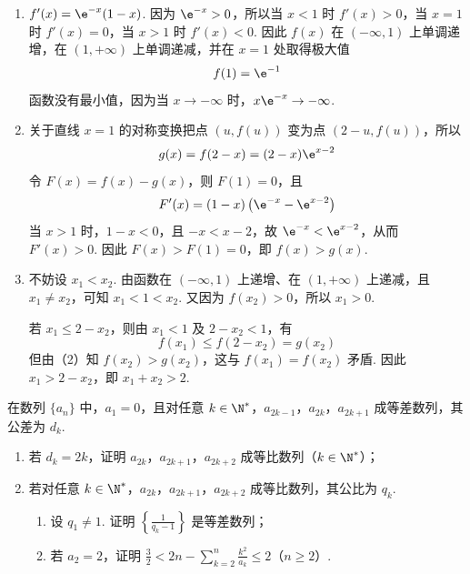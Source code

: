 \begin{solution}
\begin{enumerate}
\item \(f'(x)=\e^{-x}(1-x)\). 因为 \(\e^{-x}>0\)，所以当 \(x<1\) 时 \(f'(x)>0\)，当 \(x=1\) 时 \(f'(x)=0\)，当 \(x>1\) 时 \(f'(x)<0\). 因此 \(f(x)\) 在 \((-\infty,1)\) 上单调递增，在 \((1,+\infty)\) 上单调递减，并在 \(x=1\) 处取得极大值
\[
f(1)=\e^{-1}
\]
函数没有最小值，因为当 \(x\to-\infty\) 时，\(x\e^{-x}\to-\infty\).
\item 关于直线 \(x=1\) 的对称变换把点 \((u,f(u))\) 变为点 \((2-u,f(u))\)，所以
\[
g(x)=f(2-x)=(2-x)\e^{x-2}
\]
令 \(F(x)=f(x)-g(x)\)，则 \(F(1)=0\)，且
\[
F'(x)=(1-x)\left(\e^{-x}-\e^{x-2}\right)
\]
当 \(x>1\) 时，\(1-x<0\)，且 \(-x<x-2\)，故 \(\e^{-x}<\e^{x-2}\)，从而 \(F'(x)>0\). 因此 \(F(x)>F(1)=0\)，即 \(f(x)>g(x)\).
\item 不妨设 \(x_1<x_2\). 由函数在 \((-\infty,1)\) 上递增、在 \((1,+\infty)\) 上递减，且 \(x_1\ne x_2\)，可知 \(x_1<1<x_2\). 又因为 \(f(x_2)>0\)，所以 \(x_1>0\).

若 \(x_1\leqslant2-x_2\)，则由 \(x_1<1\) 及 \(2-x_2<1\)，有
\[
f(x_1)\leqslant f(2-x_2)=g(x_2)
\]
但由（2）知 \(f(x_2)>g(x_2)\)，这与 \(f(x_1)=f(x_2)\) 矛盾. 因此 \(x_1>2-x_2\)，即 \(x_1+x_2>2\).
\end{enumerate}
\end{solution}

\begin{problem}
在数列 \(\{a_{n}\}\) 中，\(a_{1} = 0\)，且对任意 \(k \in \N^*\)，\(a_{2k-1}\)，\(a_{2k}\)，\(a_{2k+1}\) 成等差数列，其公差为 \(d_{k}\).
\begin{enumerate}
\item 若 \(d_{k} = 2k\)，证明 \(a_{2k}\)，\(a_{2k+1}\)，\(a_{2k+2}\) 成等比数列（\(k \in \N^*\)）；
\item 若对任意 \(k \in \N^*\)，\(a_{2k}\)，\(a_{2k+1}\)，\(a_{2k+2}\) 成等比数列，其公比为 \(q_k\).
\begin{enumerate}
\item 设 \(q_{1} \neq 1\). 证明 \(\left\{\frac{1}{q_{k}-1}\right\}\) 是等差数列；
\item 若 \(a_2 = 2\)，证明 \(\frac{3}{2} < 2n - \sum_{k=2}^{n} \frac{k^2}{a_k} \leqslant 2\)（\(n \geqslant 2\)）.
\end{enumerate}
\end{enumerate}
\end{problem}

